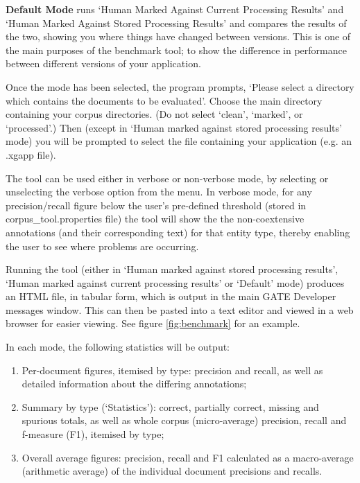 {\bf Default Mode} runs `Human Marked Against Current Processing Results' and
`Human Marked Against Stored Processing Results' and compares the results of the
two, showing you where things have changed between versions. This is one of the
main purposes of the benchmark tool; to show the difference in performance
between different versions of your application.

Once the mode has been selected, the program prompts, `Please select a directory
which contains the documents to be evaluated'. Choose the main directory
containing your corpus directories. (Do not select `clean', `marked', or
`processed'.) Then (except in `Human marked against stored processing
results' mode) you will be prompted to select the file containing your
application (e.g. an .xgapp file).

The tool can be used either in verbose or non-verbose mode, by selecting or
unselecting the verbose option from the menu. In verbose mode, for any
precision/recall figure below the user's pre-defined threshold (stored in
corpus\_tool.properties file) the tool will show the the non-coextensive
annotations (and their corresponding text) for that entity type, thereby enabling
the user to see where problems are occurring.


Running the tool (either in `Human marked against stored processing results',
`Human marked against current processing results' or `Default' mode) produces an
HTML file, in tabular form, which is output in the main GATE Developer messages
window. This can then be pasted into a text editor and viewed in a web
browser for easier viewing. See figure \ref{fig:benchmark} for an example.

In each mode, the following statistics will be output:

\begin{enumerate}
  \item Per-document figures, itemised by type: precision and recall, as well as
  detailed information about the differing annotations;
  \item Summary by type (`Statistics'): correct, partially correct, missing
  and spurious totals, as well as whole corpus (micro-average) precision,
  recall and f-measure (F1), itemised by type;
  \item Overall average figures: precision, recall and F1 calculated as a
  macro-average (arithmetic average) of the individual document precisions and recalls.
\end{enumerate}

